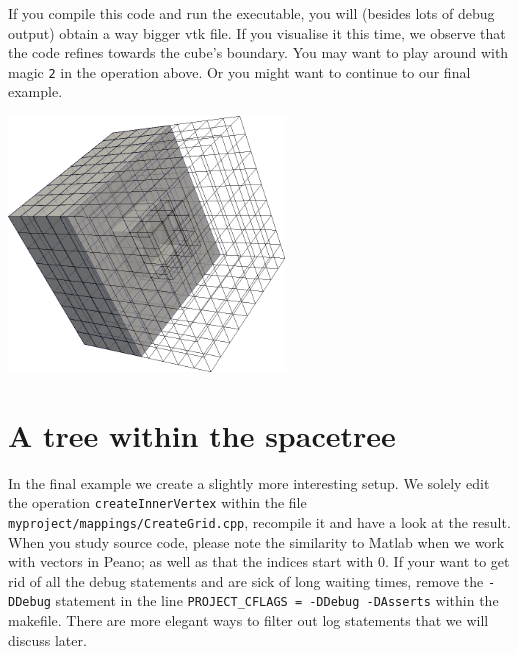 \noindent
If you compile this code and run the executable, you will (besides lots of
debug output) obtain a way bigger vtk file. 
If you visualise it this time, we observe that the code refines towards the
cube's boundary. 
You may want to play around with magic \texttt{2} in the operation above. 
Or you might want to continue to our final example.

\begin{center}
  \includegraphics[width=0.55\textwidth]{10_quickstart/cube.png}
\end{center}


\section{A tree within the spacetree}

In the final example we create a slightly more interesting setup. 
We solely edit the operation \texttt{createInnerVertex} within the  
file \texttt{myproject/mappings/CreateGrid.cpp}, recompile it and 
have a look at the result.
When you study source code, please note the similarity to Matlab when we work
with vectors in Peano; as well as that the indices start with 0.
If your want to get rid of all the debug statements and are sick of long 
waiting times, remove the \texttt{-DDebug} statement in the line  
\texttt{PROJECT\_CFLAGS = -DDebug -DAsserts}
within the makefile.
There are more elegant ways to filter out log statements that we will discuss
later.


